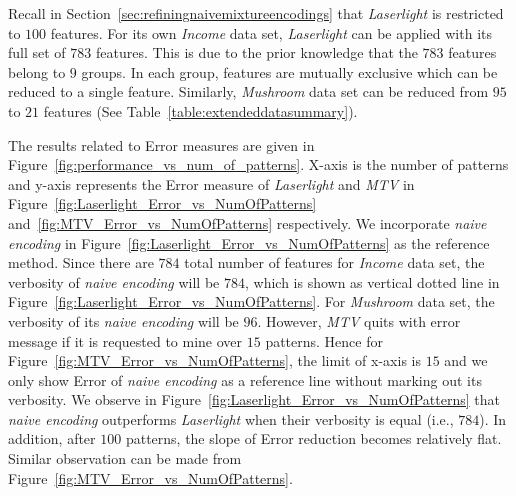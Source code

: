 Recall in Section~\ref{sec:refiningnaivemixtureencodings} that \textit{Laserlight} is restricted to $100$ features.
For its own \textit{Income} data set, \textit{Laserlight} can be applied with its full set of $783$ features.
This is due to the prior knowledge that the $783$ features belong to $9$ groups.
In each group, features are mutually exclusive which can be reduced to a single feature.
Similarly, \textit{Mushroom} data set can be reduced from $95$ to $21$ features (See Table~\ref{table:extendeddatasummary}).

The results related to Error measures are given in Figure~\ref{fig:performance_vs_num_of_patterns}.
X-axis is the number of patterns and y-axis represents the Error measure of \textit{Laserlight} and \textit{MTV} in Figure~\ref{fig:Laserlight_Error_vs_NumOfPatterns} and~\ref{fig:MTV_Error_vs_NumOfPatterns} respectively.
We incorporate \textit{naive encoding} in Figure~\ref{fig:Laserlight_Error_vs_NumOfPatterns} as the reference method.
Since there are $784$ total number of features for \textit{Income} data set, the verbosity of \textit{naive encoding} will be $784$, which is shown as vertical dotted line in Figure~\ref{fig:Laserlight_Error_vs_NumOfPatterns}.
For \textit{Mushroom} data set, the verbosity of its \textit{naive encoding} will be $96$.
However, \textit{MTV} quits with error message if it is requested to mine over $15$ patterns.
Hence for Figure~\ref{fig:MTV_Error_vs_NumOfPatterns}, the limit of x-axis is $15$ and we only show Error of \textit{naive encoding} as a reference line without marking out its verbosity. 
We observe in Figure~\ref{fig:Laserlight_Error_vs_NumOfPatterns} that \textit{naive encoding} outperforms \textit{Laserlight} when their verbosity is equal (i.e., $784$).
In addition, after $100$ patterns, the slope of Error reduction becomes relatively flat.
Similar observation can be made from Figure~\ref{fig:MTV_Error_vs_NumOfPatterns}.


